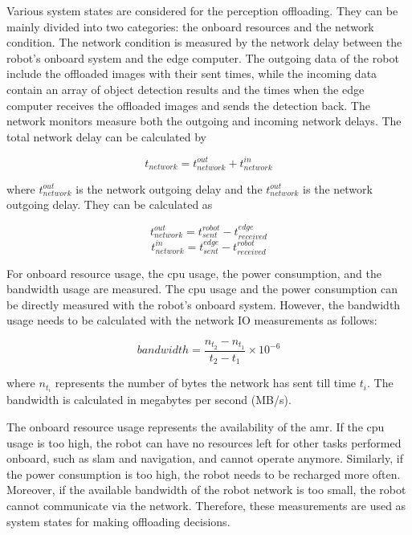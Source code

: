 Various system states are considered for the perception offloading. They can be mainly divided into two categories: the onboard resources and the network condition. The network condition is measured by the network delay between the robot's onboard system and the edge computer. The outgoing data of the robot include the offloaded images with their sent times, while the incoming data contain an array of object detection results and the times when the edge computer receives the offloaded images and sends the detection back. The network monitors measure both the outgoing and incoming network delays. The total network delay can be calculated by

\begin{equation}
    t_{network} = t_{network}^{out} + t_{network}^{in}
\end{equation}

where $t_{network}^{out}$ is the network outgoing delay and the $t_{network}^{out}$ is the network outgoing delay. They can be calculated as

\begin{equation*}
    t_{network}^{out} = t_{sent}^{robot} - t_{received}^{edge}
\end{equation*}
\begin{equation*}
    t_{network}^{in} = t_{sent}^{edge} - t_{received}^{robot}
\end{equation*}

For onboard resource usage, the \gls{cpu} usage, the power consumption, and the bandwidth usage are measured. The \gls{cpu} usage and the power consumption can be directly measured with the robot's onboard system. However, the bandwidth usage needs to be calculated with the network IO measurements as follows:

\begin{equation}
    bandwidth = \frac{n_{t_2} - n_{t_1}}{t_2 - t_1} \times 10^{-6} 
\end{equation}

where $n_{t_i}$ represents the number of bytes the network has sent till time $t_i$. The bandwidth is calculated in megabytes per second (MB/s). 

The onboard resource usage represents the availability of the \gls{amr}. If the \gls{cpu} usage is too high, the robot can have no resources left for other tasks performed onboard, such as \gls{slam} and navigation, and cannot operate anymore. Similarly, if the power consumption is too high, the robot needs to be recharged more often. Moreover, if the available bandwidth of the robot network is too small, the robot cannot communicate via the network. Therefore, these measurements are used as system states for making offloading decisions. 

